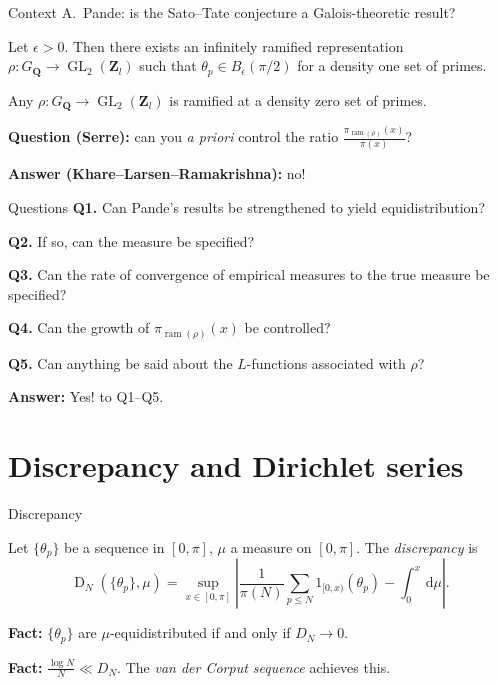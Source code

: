 \documentclass[handout]{beamer}
\DeclareMathOperator{\D}{D}
\DeclareMathOperator{\GL}{GL}
\DeclareMathOperator{\ram}{ram}
\newcommand{\bQ}{\mathbf{Q}}
\newcommand{\bZ}{\mathbf{Z}}
\newcommand{\dd}{\mathrm{d}}
\begin{document}
\begin{frame}{Context}
A.~Pande: is the Sato--Tate conjecture a Galois-theoretic result?
\pause

\begin{theorem}[Pande]
Let $\epsilon>0$. Then there exists an infinitely ramified representation 
$\rho\colon G_\bQ \to \GL_2(\bZ_l)$ such that $\theta_p\in B_\epsilon(\pi/2)$ 
for a density one set of primes. 
\end{theorem}
\pause

\begin{theorem}
Any $\rho\colon G_\bQ \to \GL_2(\bZ_l)$ is ramified at a density zero set of 
primes. 
\end{theorem}
\pause

\textbf{Question (Serre):} can you \emph{a priori} control the ratio 
$\frac{\pi_{\ram(\rho)}(x)}{\pi(x)}$?
\pause

\textbf{Answer (Khare--Larsen--Ramakrishna):} no!
\end{frame}


\begin{frame}{Questions}
\textbf{Q1.} Can Pande's results be strengthened to yield equidistribution? 
\pause

\textbf{Q2.} If so, can the measure be specified?
\pause

\textbf{Q3.} Can the rate of convergence of empirical measures to the true measure 
be specified?

\textbf{Q4.} Can the growth of $\pi_{\ram(\rho)}(x)$ be controlled?
\pause

\textbf{Q5.} Can anything be said about the $L$-functions associated with $\rho$?
\pause

\textbf{Answer:} Yes! to Q1--Q5. 
\end{frame}





\section{Discrepancy and Dirichlet series}


\begin{frame}{Discrepancy}
\begin{definition}
Let $\{\theta_p\}$ be a sequence in $[0,\pi]$, $\mu$ a measure on $[0,\pi]$. 
The \emph{discrepancy} is 
\[
	\D_N(\{\theta_p\},\mu) =  \sup_{x\in [0,\pi]}\left| \frac{1}{\pi(N)} \sum_{p\leqslant N} 1_{[0,x)}(\theta_p) - \int_0^x \, \dd\mu\right| .
\]
\end{definition}
\pause

\textbf{Fact:}
$\{\theta_p\}$ are $\mu$-equidistributed if and only if $D_N \to 0$. 
\pause

\textbf{Fact:}
$\frac{\log N}{N} \ll D_N$. The \emph{van der Corput sequence} achieves this. 
\end{frame}
\end{document}

